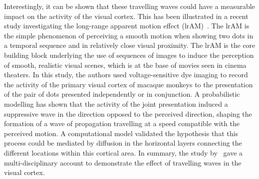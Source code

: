 \documentclass[brainsci, %
               review,submit,pdftex,moreauthors
               ]{Definitions/mdpi}
\begin{document}
Interestingly, it can be shown that these travelling waves could have a measurable impact on the activity of the visual cortex. This has been illustrated in a recent study investigating the long-range apparent motion effect (lrAM)~\citep{chemla_suppressive_2019}. The lrAM is the simple phenomenon of perceiving a smooth motion when showing two dots in a temporal sequence and in relatively close visual proximity. The lrAM is the core building block underlying the use of sequences of images to induce the perception of smooth, realistic visual scenes, which is at the base of movies seen in cinema theaters. In this study, the authors used voltage-sensitive dye imaging to record the activity of the primary visual cortex of macaque monkeys to the presentation of the pair of dots presented independently or in conjunction. A probabilistic modelling has shown that the activity of the joint presentation induced a suppressive wave in the direction opposed to the perceived direction, shaping the formation of a wave of propagation travelling at a speed compatible with the perceived motion. A computational model validated the hypothesis that this process could be mediated by diffusion in the horizontal layers connecting the different locations within this cortical area. In summary, the study by~\citet{chemla_suppressive_2019} gave a multi-disciplinary account to demonstrate the effect of travelling waves in the visual cortex.
%
%
\end{document}
